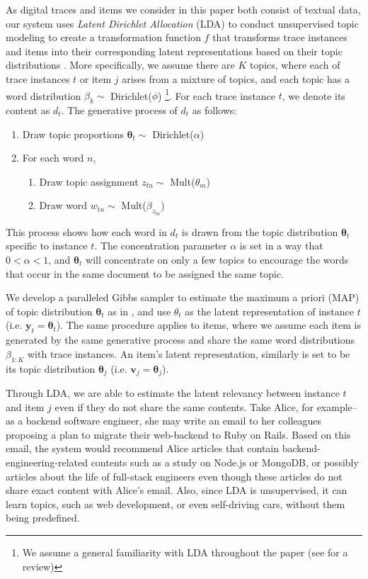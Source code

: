 \documentclass[conference]{IEEEtran}
\begin{document}
As digital traces and items we consider in this paper both consist of textual data, our system uses \textit{Latent Dirichlet Allocation} (LDA) to conduct unsupervised topic modeling to create a transformation function $f$ that transforms trace instances and items into their corresponding latent representations based on their topic distributions \cite{Blei:2003}. More specifically, we assume there are $K$ topics, where each of trace instances $t$ or item $j$ arises from a mixture of topics, and each topic has a word distribution $\beta_{k} \sim $ Dirichlet($\phi$) \footnote{We assume a general familiarity with LDA throughout the paper (see \cite{Blei:2012:PTM:2133806.2133826} for a review)}. For each trace instance $t$, we denote its content as $d_t$. The generative process of $d_t$ as follows:
\begin{enumerate}
\item Draw topic proportions $\mathbf{\theta}_t \sim $ Dirichlet($\alpha$)
\item For each word $n$,
    \begin{enumerate}
        \item Draw topic assignment $z_{tn} \sim $ Mult($\theta_m$)
        \item Draw word $w_{tn} \sim $ Mult($\beta_{z_{tn}}$)
    \end{enumerate}
\end{enumerate} This process shows how each word in $d_t$ is drawn from the topic distribution $\mathbf{\theta}_t$ specific to instance $t$. The concentration parameter $\alpha$ is set in a way that $0 < \alpha < 1$, and $\mathbf{\theta}_t$ will concentrate on only a few topics to encourage the words that occur in the same document to be assigned the same topic. 

We develop a paralleled Gibbs sampler to estimate the maximum a priori (MAP) of topic distribution $\mathbf{\theta}_t$ as in \cite{mccallum2002mallet}, and use $\theta_t$ as the latent representation of instance $t$ (i.e. $\mathbf{y}_t=\mathbf{\theta}_t$). The same procedure applies to items, where we assume each item is generated by the same generative process and share the same word distributions $\beta_{1:K}$ with trace instances. An item's latent representation, similarly is set to be its topic distribution $\mathbf{\theta}_j$ (i.e. $\mathbf{v}_j=\mathbf{\theta}_j$). 

Through LDA, we are able to estimate the latent relevancy between instance $t$ and item $j$ even if they do not share the same contents. Take Alice, for example--as a backend software engineer, she may write an email to her colleagues proposing a plan to migrate their web-backend to Ruby on Rails. Based on this email, the system would recommend Alice articles that contain backend-engineering-related contents such as a study on Node.js or MongoDB, or possibly articles about the life of full-stack engineers even though these articles do not share exact content with Alice's email. Also, since LDA is unsupervised, it can learn topics, such as web development, or even self-driving cars, without them being predefined. 
\end{document}
